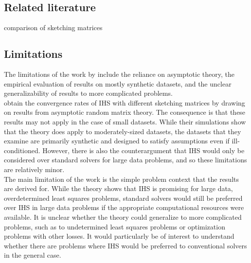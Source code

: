 \subsection{Related literature}

\todo
comparison of sketching matrices \citet{Dobriban:2019}

\subsection{Limitations}

The limitations of the work by \citet{Lacotte:2020} include the reliance on asymptotic theory, the empirical evaluation of results on mostly synthetic datasets, and the unclear generalizability of results to more complicated problems.
\\

\citet{Lacotte:2020} obtain the convergence rates of IHS with different sketching matrices by drawing on results from asymptotic random matrix theory. The consequence is that these results may not apply in the case of small datasets. While their simulations show that the theory does apply to moderately-sized datasets, the datasets that they examine are primarily synthetic and designed to satisfy assumptions even if ill-conditioned. However, there is also the counterargument that IHS would only be considered over standard solvers for large data problems, and so these limitations are relatively minor.
\\

The main limitation of the work is the simple problem context that the results are derived for. While the theory shows that IHS is promising for large data, overdetermined least squares problems, standard solvers would still be preferred over IHS in large data problems if the appropriate computational resources were available. It is unclear whether the theory could generalize to more complicated problems, such as to undetermined least squares problems or optimization problems with other losses. It would particularly be of interest to understand whether there are problems where IHS would be preferred to conventional solvers in the general case.